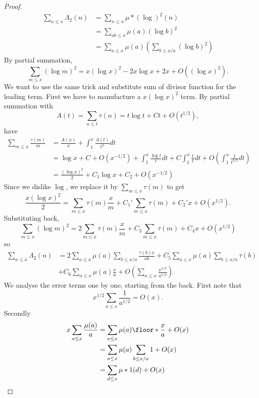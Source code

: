 \documentclass[a4paper]{article}
\theoremstyle{definition}
\begin{document}
\begin{proof}
  \begin{align*}
    \sum_{n \leq x} \Lambda_2(n)
    &= \sum_{n \leq x} \mu * (\log)^2 (n) \\
    &= \sum_{ab \leq x} \mu(a) (\log b)^2 \\
    &= \sum_{a \leq x} \mu(a) \left( \sum_{b \leq x/a} (\log b)^2 \right)
  \end{align*}
  By partial summation,
  \[
    \sum_{m \leq x} (\log m)^2
    = x (\log x)^2 - 2x \log x + 2x + O((\log x)^2).
  \]
  We want to use the same trick and substitute sum of divisor function for the leading term. First we have to manufacture a \(x (\log x)^2\) term. By partial summation with
  \[
    A(t) = \sum_{n \leq t} \tau(n) = t \log t + Ct + O(t^{1/2}),
  \]
  have
  \begin{align*}
    \sum_{m \leq x} \frac{\tau(m)}{m}
    &= \frac{A(x)}{x} + \int_1^x \frac{A(t)}{t^2} dt \\
    &= \log x + C + O(x^{-1/2}) + \int_1^x \frac{\log t}{t} dt + C \int_1^x \frac{1}{t} dt + O(\int_1^x \frac{1}{t^{3/2}} dt) \\
    &= \frac{(\log x)^2}{2} + C_1 \log x + C_2 + O(x^{-1/2})
  \end{align*}
  Since we dislike \(\log\), we replace it by \(\sum_{m \leq x} \tau(m)\) to get
  \[
    \frac{x (\log x)^2}{2}
    = \sum_{m \leq x} \tau(m) \frac{x}{m} + C_1' \sum_{m \leq x} \tau(m) + C_2'x + O(x^{1/2}).
  \]
  Substituting back,
  \[
    \sum_{m \leq x} (\log m)^2
    = 2 \sum_{m \leq x} \tau(m) \frac{x}{m} + C_3 \sum_{m \leq x} \tau(m) + C_4 x + O(x^{1/2})
  \]
  so
  \begin{align*}
    \sum_{n \leq x} \Lambda_2(n)
    &= 2 \sum_{a \leq x} \mu(a) \sum_{b \leq x/a} \frac{\tau(b)x}{ab} + C_5 \sum_{a \leq x} \mu(a) \sum_{b \leq x/a} \tau(b) \\
    &+ C_6 \sum_{a \leq x} \mu(a) \frac{x}{a} + O(\sum_{a \leq x} \frac{x^{1/2}}{a^{1/2}}).
  \end{align*}
  We analyse the error terms one by one, starting from the back. First note that
  \[
    x^{1/2} \sum_{a \leq x} \frac{1}{a^{1/2}} = O(x).
  \]
  Secondly
  \begin{align*}
    x \sum_{a \leq x} \frac{\mu(a)}{a}
    &= \sum_{a \leq x} \mu(a) \floor*{\frac{x}{a}} + O(x) \\
    &= \sum_{a \leq x} \mu(a) \sum_{b \leq x/a} 1 + O(x) \\
    &= \sum_{d \leq x} \mu * 1(d) + O(x) \\

\end{align*}
\end{proof}
\end{document}
